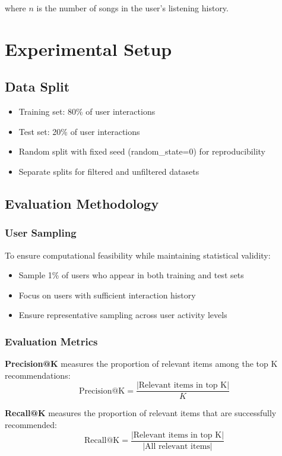 \documentclass[12pt,a4paper]{article}
\begin{document}
where $n$ is the number of songs in the user's listening history.

\section{Experimental Setup}

\subsection{Data Split}
\begin{itemize}
    \item Training set: 80\% of user interactions
    \item Test set: 20\% of user interactions
    \item Random split with fixed seed (random\_state=0) for reproducibility
    \item Separate splits for filtered and unfiltered datasets
\end{itemize}

\subsection{Evaluation Methodology}

\subsubsection{User Sampling}
To ensure computational feasibility while maintaining statistical validity:
\begin{itemize}
    \item Sample 1\% of users who appear in both training and test sets
    \item Focus on users with sufficient interaction history
    \item Ensure representative sampling across user activity levels
\end{itemize}

\subsubsection{Evaluation Metrics}

\textbf{Precision@K} measures the proportion of relevant items among the top K recommendations:
\begin{equation}
\text{Precision@K} = \frac{|\text{Relevant items in top K}|}{K}
\end{equation}

\textbf{Recall@K} measures the proportion of relevant items that are successfully recommended:
\begin{equation}
\text{Recall@K} = \frac{|\text{Relevant items in top K}|}{|\text{All relevant items}|}
\end{equation}
\end{document}
